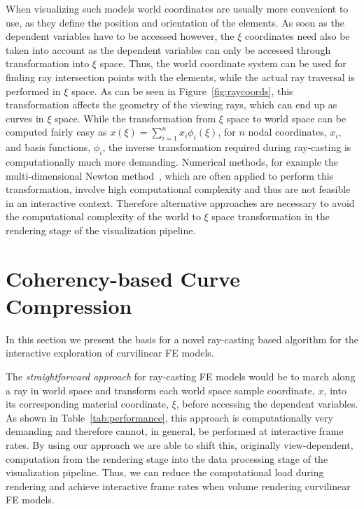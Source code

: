 \documentclass[journal]{vgtc}                %
\begin{document}
When visualizing such models world coordinates are usually more convenient to use, as they define the position and orientation of the elements. As soon as the dependent variables have to be accessed however, the $\xi$ coordinates need also be taken into account as the dependent variables can only be accessed through transformation into $\xi$ space. Thus, the world coordinate system can be used for finding ray intersection points with the elements, while the actual ray traversal is performed in $\xi$ space. As can be seen in Figure~\ref{fig:raycoords}, this transformation affects the geometry of the viewing rays, which can end up as curves in $\xi$ space. While the transformation from $\xi$ space to world space can be computed fairly easy as $x(\xi)=\sum_{i=1}^n x_i \phi_i(\xi)$, for $n$ nodal coordinates, $x_i$, and basis functions, $\phi_i$, the inverse transformation required during ray-casting is computationally much more demanding. Numerical methods, for example the multi-dimensional Newton method~\cite{Press92}, which are often applied to perform this transformation, involve high computational complexity and thus are not feasible in an interactive context. Therefore alternative approaches are necessary to avoid the computational complexity of the world to $\xi$ space transformation in the rendering stage of the visualization pipeline.
%
%
%
\section{Coherency-based Curve Compression}\label{sec:preprocessing}
In this section we present the basis for a novel ray-casting based algorithm for the interactive exploration of curvilinear FE models.

The \emph{straightforward approach} for ray-casting FE models would be to march along a ray in world space and transform each world space sample coordinate, $x$, into its corresponding material coordinate, $\xi$, before accessing the dependent variables. As shown in Table~\ref{tab:performance}, this approach is computationally very demanding and therefore cannot, in general, be performed at interactive frame rates. By using our approach we are able to shift this, originally view-dependent, computation from the rendering stage into the data processing stage of the visualization pipeline. Thus, we can reduce the computational load during rendering and achieve interactive frame rates when volume rendering curvilinear FE models.
\end{document}
